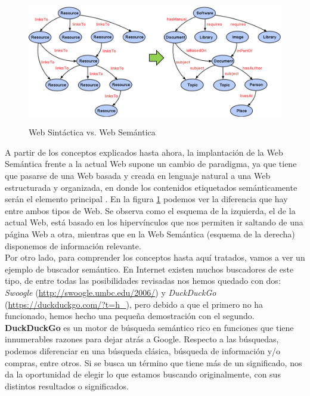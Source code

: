 \begin{figure}[H]
	\centering
	\includegraphics[height=5.60cm]{imagenes/capitulo3/web-actual-web-semantica.png}
	\caption{Web Sintáctica vs. Web Semántica \cite{imagen-diferencia}}
	\label{wa-ws}
\end{figure}

A partir de los conceptos explicados hasta ahora, la implantación de la Web Semántica frente a la actual Web supone un cambio de paradigma, ya que tiene que pasarse de una Web basada y creada en lenguaje natural a una Web estructurada y organizada, en donde los contenidos etiquetados semánticamente serán el elemento principal \cite{researchgate}. En la figura \ref{wa-ws} podemos ver la diferencia que hay entre ambos tipos de Web. Se observa como el esquema de la izquierda, el de la actual Web, está basado en los hipervínculos que nos permiten ir saltando de una página Web a otra, mientras que en la Web Semántica (esquema de la derecha) disponemos de información relevante.\\



Por otro lado, para comprender los conceptos hasta aquí tratados, vamos a ver un ejemplo de buscador semántico. En Internet existen muchos buscadores de este tipo, de entre todas las posibilidades revisadas \cite{buscadores-semanticos} nos hemos quedado con dos: \textit{Swoogle} (\url{http://swoogle.umbc.edu/2006/}) y \textit{DuckDuckGo} (\url{https://duckduckgo.com/?t=h_}), pero debido a que el primero no ha funcionado, hemos hecho una pequeña demostración con el segundo. \textbf{DuckDuckGo} es un motor de búsqueda semántico rico en funciones que tiene innumerables razones para dejar atrás a Google. Respecto a las búsquedas, podemos diferenciar en una búsqueda clásica, búsqueda de información y/o compras, entre otros. Si se busca un término que tiene más de un significado, nos da la oportunidad de elegir lo que estamos buscando originalmente, con sus distintos resultados o significados. 

